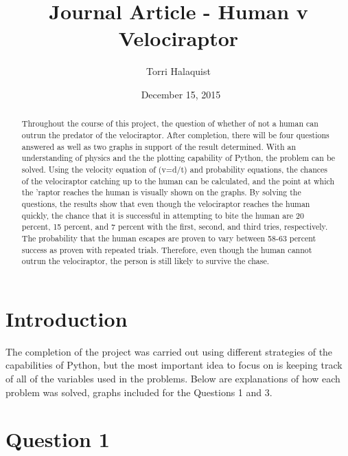\documentclass[twocolumn]{revtex4}
\begin{document}
\title{Journal Article - Human v Velociraptor}
\author{Torri Halaquist}
\date{\ December 15, 2015}
\begin{abstract}
    Throughout the course of this project, the question of whether of not a human can outrun the predator of the velociraptor. After completion, there will be four questions answered as well as two graphs in support of the result determined. With an understanding of physics and the the plotting capability of Python, the problem can be solved. Using the velocity equation of (v=d/t) and probability equations, the chances of the velociraptor catching up to the human can be calculated, and the point at which the 'raptor reaches the human is visually shown on the graphs. By solving the questions, the results show that even though the velociraptor reaches the human quickly, the chance that it is successful in attempting to bite the human are 20 percent, 15 percent, and 7 percent with the first, second, and third tries, respectively. The probability that the human escapes are proven to vary between 58-63 percent success as proven with repeated trials. Therefore, even though the human cannot outrun the velociraptor, the person is still likely to survive the chase. 
\end{abstract}

\maketitle

\section{Introduction}
The completion of the project was carried out using different strategies of the capabilities of Python, but the most important idea to focus on is keeping track of all of the variables used in the problems. Below are explanations of how each problem was solved, graphs included for the Questions 1 and 3.

\section{Question 1}
\end{document}
